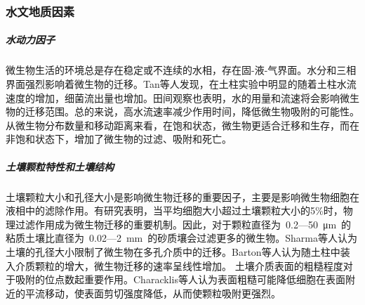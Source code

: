 \documentclass[a4paper,cs4size,adobefonts,fancyhdr]{ctexart}[2005/11/25]
\numberwithin{equation}{section} %
\begin{document}
\subsubsection{水文地质因素}
\subparagraph{水动力因子} 
微生物生活的环境总是存在稳定或不连续的水相，存在固-液-气界面。水分和三相界面强烈影响着微生物的迁移。Tan等人发现，在土柱实验中明显的随着土柱水流速度的增加，细菌流出量也增加。田间观察也表明，水的用量和流速将会影响微生物的迁移范围。总的来说，高水流速率减少作用时间，降低微生物吸附的可能性。从微生物分布数量和移动距离来看，在饱和状态，微生物更适合迁移和生存，而在非饱和状态下，增加了微生物的过滤、吸附和死亡。
\subparagraph{土壤颗粒特性和土壤结构}
土壤颗粒大小和孔径大小是影响微生物迁移的重要因子，主要是影响微生物细胞在液相中的滤除作用。有研究表明，当平均细胞大小超过土壤颗粒大小的5\%时，物理过滤作用成为微生物迁移的重要机制。因此，对于颗粒直径为~\num{0.2}---\SI{50}{\micro m}~的粘质土壤比直径为~\num{0.02}---\SI{2}{mm}~的砂质壤会过滤更多的微生物。Sharma等人认为土壤的孔径大小限制了微生物在多孔介质中的迁移。Barton等人认为随土柱中装入介质颗粒的增大，微生物迁移的速率呈线性增加。 土壤介质表面的粗糙程度对于吸附的位点数起重要作用。Characklis等人认为表面粗糙可能降低细胞在表面附近的平流移动，使表面剪切强度降低，从而使颗粒吸附更强烈。
\end{document}
